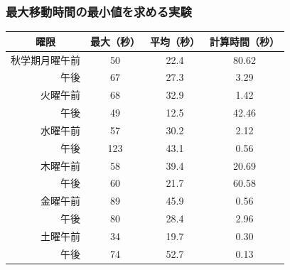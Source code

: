 \documentclass[dvipdfmx,12pt]{beamer}
\begin{document}
\begin{frame}\frametitle{最大移動時間の最小値を求める実験}
\begin{table}
\begin{center}
\vspace{-5pt}
\begin{tabular}{|r|cc|c|}
\hline
\multicolumn{1}{|c|}{曜限} &  最大（秒）  & 平均（秒） & 計算時間（秒）\\
\hline
秋学期月曜午前  & 50  & 22.4 & 80.62\\
午後            & 67  & 27.3 &  3.29\\          
火曜午前        & 68  & 32.9 &  1.42\\
午後            & 49  & 12.5 & 42.46\\          
水曜午前        & 57  & 30.2 &  2.12\\
午後            & 123 & 43.1 &  0.56\\          
木曜午前        & 58  & 39.4 & 20.69\\
午後            & 60  & 21.7 & 60.58\\          
金曜午前        & 89  & 45.9 &  0.56\\
午後            & 80  & 28.4 &  2.96\\          
土曜午前        & 34  & 19.7 &  0.30\\
午後            & 74  & 52.7 &  0.13\\
\hline                                        	         
\end{tabular}
\end{center}
\end{table}


\end{frame}
\end{document}
